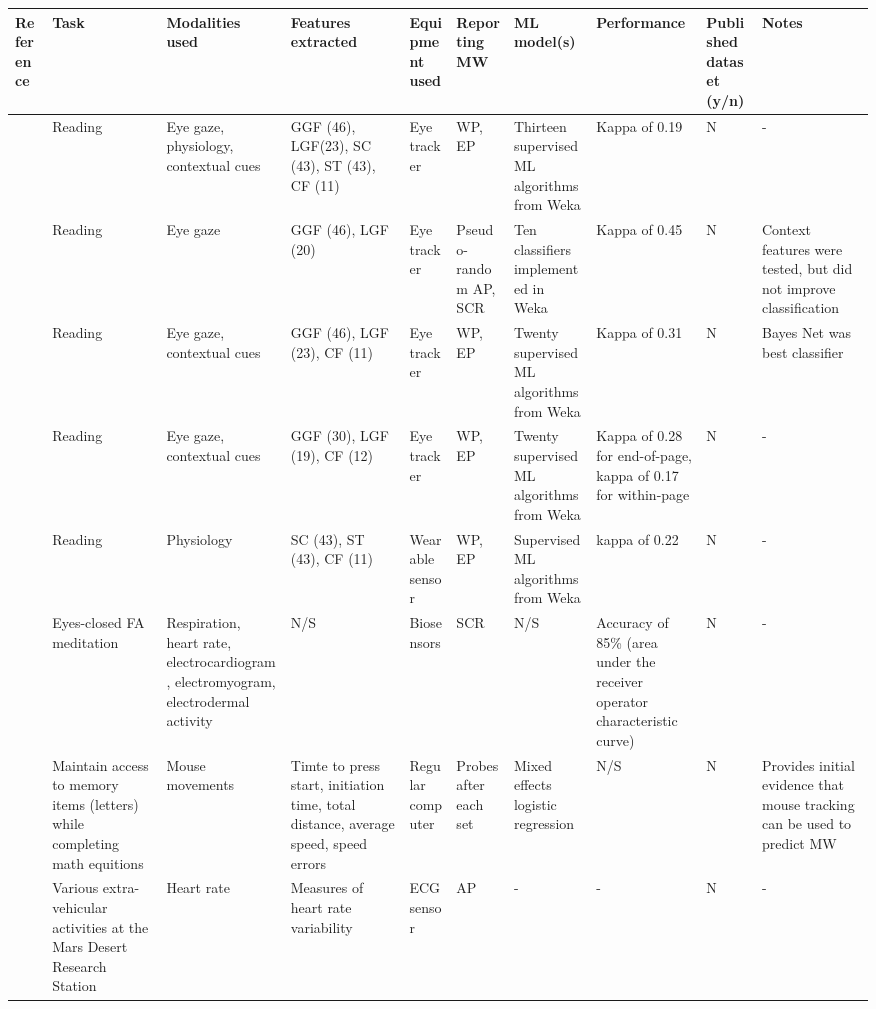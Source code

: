 \begin{landscape}
\begin{xtabular}{p{25mm}p{25mm}p{30mm}p{18mm}p{32mm}p{22mm}p{2cm}p{2cm}p{15mm}p{32cm}}
  \toprule
  Reference & Task & Modalities used & Features extracted & Equipment used & Reporting MW & ML model(s) & Performance & Published dataset (y/n) & Notes \\
  \midrule
\cite{Bixler2015AutomaticPhysiology} & Reading & Eye gaze, physiology, contextual cues & GGF (46), LGF(23), SC (43), ST (43), CF (11) & Eye tracker & WP, EP & Thirteen supervised ML algorithms from Weka & Kappa of 0.19 & N & -\\ \midrule 
\cite{Bixler2015AutomaticAwareness} & Reading & Eye gaze & GGF (46), LGF (20) & Eye tracker & Pseudo-random AP, SCR & Ten classifiers implemented in Weka & Kappa of 0.45 & N & Context features were tested, but did not improve classification\\ \midrule 
\cite{Bixler2016AutomaticReading} & Reading & Eye gaze, contextual cues & GGF (46), LGF (23), CF (11) & Eye tracker & WP, EP & Twenty supervised ML algorithms from Weka & Kappa of 0.31 & N & Bayes Net was best classifier\\ \midrule
\cite{Bixler2014TowardWandering} & Reading & Eye gaze, contextual cues & GGF (30), LGF (19), CF (12) & Eye tracker & WP, EP & Twenty supervised ML algorithms from Weka & Kappa of 0.28 for end-of-page, kappa of 0.17 for within-page & N & -\\ \midrule 
\cite{Blanchard2014AutomatedLearning} & Reading & Physiology & SC (43), ST (43), CF (11) & Wearable sensor & WP, EP & Supervised ML algorithms from Weka & kappa of 0.22 & N & -\\ \midrule
\cite{Cheetham2016AutomatedApplication} & Eyes-closed FA meditation & Respiration, heart rate, electrocardiogram, electromyogram, electrodermal activity & N/S & Biosensors & SCR & N/S & Accuracy of 85\% (area under the receiver operator characteristic curve) & N & -\\\hline 
\cite{DaSilva2018WanderingWandering} & Maintain access to memory items (letters) while completing math equitions & Mouse movements & Timte to press start, initiation time, total distance, average speed, speed errors & Regular computer & Probes after each set & Mixed effects logistic regression & N/S & N & Provides initial evidence that mouse tracking can be used to predict MW\\\hline 
\cite{Gontier2016HowEnvironment} & Various extra-vehicular activities at the Mars Desert Research Station & Heart rate & Measures of heart rate variability & ECG sensor & AP & - & - & N & -\\ \midrule

\end{xtabular}
\end{landscape}
